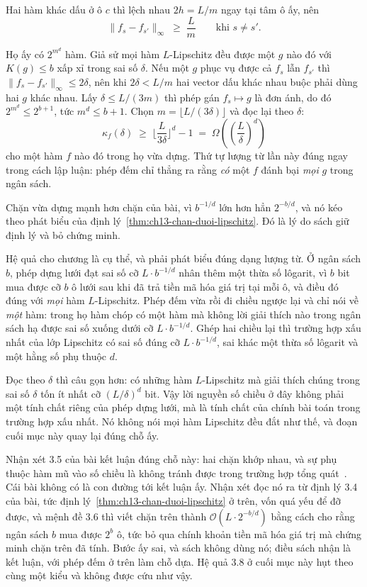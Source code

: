 Hai hàm khác dấu ở ô $c$ thì lệch nhau $2h = L/m$ ngay tại
tâm ô ấy, nên
\[
  \lVert f_s - f_{s'} \rVert_{\infty} \;\ge\; \frac{L}{m}
  \qquad \text{khi } s \ne s'.
\]

Họ ấy có $2^{m^d}$ hàm. Giả sử mọi hàm $L$-Lipschitz đều được một $g$ nào đó với
$K(g) \le b$ xấp xỉ trong sai số $\delta$. Nếu một $g$ phục vụ được cả $f_s$ lẫn
$f_{s'}$ thì $\lVert f_s - f_{s'} \rVert_{\infty} \le 2\delta$, nên khi
$2\delta < L/m$ hai vector dấu khác nhau buộc phải dùng hai $g$ khác nhau. Lấy
$\delta \le L/(3m)$ thì phép gán $f_s \mapsto g$ là đơn ánh, do đó
$2^{m^d} \le 2^{b+1}$, tức $m^d \le b+1$. Chọn
$m = \lfloor L/(3\delta) \rfloor$ và đọc lại theo $\delta$:
\[
  \kappa_f(\delta) \;\ge\; \Big\lfloor \frac{L}{3\delta} \Big\rfloor^{d} - 1
  \;=\; \Omega\!\left( \left(\frac{L}{\delta}\right)^{\!d} \right)
\]
cho một hàm $f$ nào đó trong họ vừa dựng. Thứ tự lượng từ lần này đúng ngay
trong cách lập luận: phép đếm chỉ thẳng ra rằng \emph{có} một $f$ đánh bại
\emph{mọi} $g$ trong ngân sách.

Chặn vừa dựng mạnh hơn chặn của bài, vì $b^{-1/d}$ lớn hơn hẳn $2^{-b/d}$, và nó
kéo theo phát biểu của định lý~\ref{thm:ch13-chan-duoi-lipschitz}. Đó là lý do
sách giữ định lý và bỏ chứng minh.

Hệ quả cho chương là cụ thể, và phải phát biểu đúng dạng lượng từ. Ở ngân sách
$b$, phép dựng lưới đạt sai số cỡ
$L \cdot b^{-1/d}$ nhân thêm một thừa số lôgarit, vì $b$ bit mua được cỡ $b$ ô
lưới sau khi đã trả tiền mã hóa giá trị tại mỗi ô, và điều đó đúng với
\emph{mọi} hàm $L$-Lipschitz. Phép đếm vừa rồi đi chiều ngược lại và chỉ nói về
\emph{một} hàm: trong họ hàm chóp có một hàm mà không lời giải thích nào trong
ngân sách hạ được sai số xuống dưới cỡ $L \cdot b^{-1/d}$. Ghép hai chiều lại
thì trường hợp xấu nhất của lớp Lipschitz có sai số đúng cỡ $L \cdot b^{-1/d}$,
sai khác một thừa số lôgarit và một hằng số phụ thuộc $d$.

Đọc theo $\delta$ thì câu gọn hơn: có những hàm $L$-Lipschitz mà giải thích
chúng trong sai số $\delta$ tốn ít nhất cỡ $(L/\delta)^d$ bit. Vậy lời
nguyền số chiều ở đây không phải một tính chất riêng của phép dựng lưới, mà là
tính chất của chính bài toán trong trường hợp xấu nhất. Nó không nói mọi hàm
Lipschitz đều đắt như thế, và đoạn cuối mục này quay lại đúng chỗ ấy.

Nhận xét 3.5 của bài kết luận đúng chỗ này: hai chặn khớp nhau, và sự phụ thuộc
hàm mũ vào số chiều là không tránh được trong trường hợp tổng quát~\autocite{p26limits}.
Cái bài không có là con đường tới kết luận ấy. Nhận xét đọc nó ra từ định lý 3.4
của bài, tức định lý~\ref{thm:ch13-chan-duoi-lipschitz} ở trên, vốn quá yếu để
đỡ được, và mệnh đề 3.6 thì viết chặn trên thành
$\mathcal{O}(L \cdot 2^{-b/d})$ bằng cách cho rằng ngân sách $b$ mua được $2^{b}$
ô, tức bỏ qua chính khoản tiền mã hóa giá trị mà chứng minh chặn trên đã tính.
Bước ấy sai, và sách không dùng nó; điều sách nhận là kết luận, với phép đếm ở
trên làm chỗ dựa. Hệ quả 3.8 ở cuối mục này hụt theo cùng một kiểu và không được
cứu như vậy.

